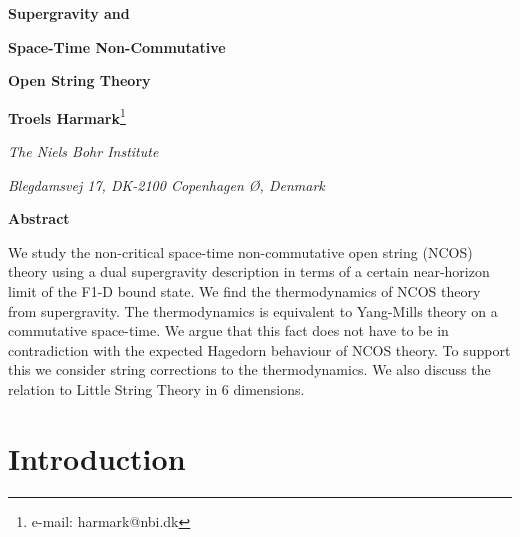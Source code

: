 \documentclass[a4paper,twoside,titlepage,12pt]{article}
\begin{document}
\begin{titlepage}

\vskip 2cm

\centerline{\Large \bf Supergravity and}
\vskip 0.2cm
\centerline{\Large \bf Space-Time Non-Commutative}
\vskip 0.2cm
\centerline{\Large \bf Open String Theory}
\vskip 0.2cm

\vskip 1.7cm
\centerline{{\bf Troels Harmark}\footnote{e-mail: harmark@nbi.dk} }
\vskip 0.3cm
\centerline{\sl The Niels Bohr Institute}
\centerline{\sl Blegdamsvej 17, DK-2100 Copenhagen \O, Denmark}
\vskip 2cm
\centerline{\bf Abstract}
\vskip 0.4cm

\noindent

We study the non-critical space-time non-commutative open string  
(NCOS) theory using a dual supergravity description in terms of 
a certain near-horizon limit of the F1-D\coordHE{} bound state.
We find the thermodynamics of NCOS theory from supergravity. 
The thermodynamics is equivalent to Yang-Mills theory 
on a commutative space-time.
We argue that this fact does not have to be in contradiction with the
expected Hagedorn behaviour of NCOS theory. 
To support this we consider string corrections to the thermodynamics.
We also discuss the relation to Little String Theory in 6 dimensions.

\end{titlepage}


\providecommand{\nn}{\nonumber}
\providecommand{\spa}{\ \ ,\ \ \ \ }
\providecommand{\str}{\mathop{{\rm Str}}}
\providecommand{\tr}{\mathop{{\rm Tr}}}
\providecommand{\sn}{\mathop{{\rm sn}}}

\providecommand{\gym}{g_{\mathrm{YM}}}
\providecommand{\geff}{g_{\mathrm{eff}}}
\providecommand{\gseff}{g_s^{\mathrm{eff}}}
\providecommand{\Ord}{{\cal{O}}}
\providecommand{\tlst}{T_{\rm LST}}


\setcounter{page}{1}

\section{Introduction}
\end{document}
